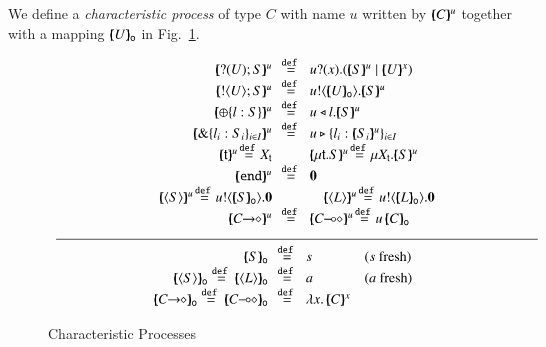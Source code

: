 \smallskip  
   
\begin{definition}\rm
We define a {\em characteristic process}
of type $C$ with name $u$ written by 
$[\!\!(C)\!\!]^{u}$ together with  
a mapping $[\!\!(U)\!\!]_{\mathsf{o}}$ 
in Fig.~\ref{fig:char}. 
\end{definition}

\smallskip

\begin{figure}[t]
	\[
	\begin{array}{c}
		\begin{array}{rclcl}
			\mapchar{\btinp{U} S}{u} &\!\!\defeq\!\!
& \binp{u}{x} (\mapchar{S}{u} \Par \mapchar{U}{x})
			\\
			\mapchar{\btout{U} S}{u} &\!\!\defeq\!\!& \bout{u}{\omapchar{U}} \mapchar{S}{u} %
			\\
			\mapchar{\btsel{l : S}}{u} &\!\!\defeq\!\!& \bsel{u}{l} \mapchar{S}{u}
			\\
			\mapchar{\btbra{l_i: S_i}_{i \in I}}{u} &\!\!\defeq\!\!& \bbra{u}{l_i: \mapchar{S_i}{u}}_{i \in I}
			\\
		\mapchar{\tvar{t}}{u} \!\defeq\! \varp{X}_{\vart{t}}
& & 
			\mapchar{\trec{t}{S}}{u} \!\defeq\! \recp{X_{\vart{t}}}{\mapchar{S}{u}}
			\\
			\mapchar{\tinact}{u} &\!\!\defeq\!\!& \inact
			\\
\mapchar{\chtype{S}}{u} \!\defeq\! \bout{u}{\omapchar{S}} \inact & & 
\quad\mapchar{\chtype{L}}{u} \!\defeq\! \bout{u}{\omapchar{L}} \inact
			\\
\mapchar{\shot{C}}{u} & \!\!\defeq\!\! & \mapchar{\lhot{C}}{u} \!\defeq\! 
\appl{u}{\omapchar{C}}
\end{array}
\\
\Hline
\\
		\begin{array}{rcll}
\omapchar{S} &\!\!\defeq\!\!& s & (s \textrm{ fresh})
			\\
\omapchar{\chtype{S}} \defeq \omapchar{\chtype{L}} &\!\!\defeq\!\!& a & 
(a \textrm{ fresh})\quad\quad
			\\
			\omapchar{\shot{C}} \defeq \omapchar{\lhot{C}} &\!\!\defeq\!\!& \abs{x}{\mapchar{C}{x}}
		\end{array}
	\end{array}
	\]
\caption{Characteristic Processes \label{fig:char}}
\Hline
\end{figure}

